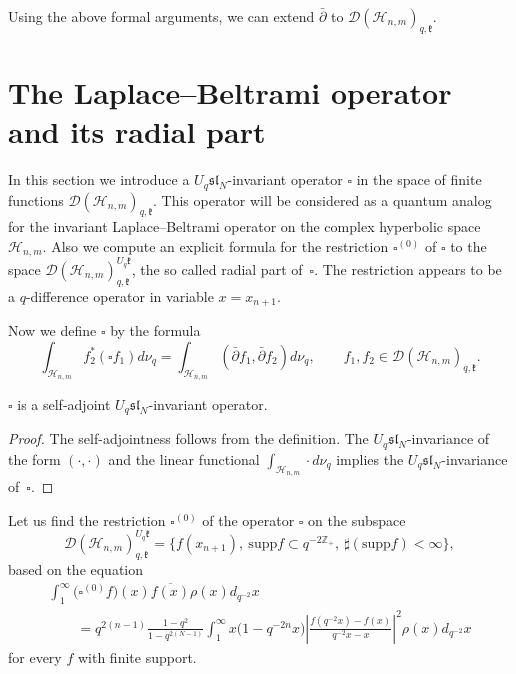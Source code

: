 \documentclass[pdftex]{sigma}
\begin{document}
Using the above formal arguments, we
can extend $\bar \partial$ to
$\mathscr{D}(\mathscr{H}_{n,m})_{q,\mathfrak{k}}$.


\section[The Laplace-Beltrami operator and its radial part]{The Laplace--Beltrami operator and its radial part}\label{sec_6}

In this section we introduce a $U_q \mathfrak{sl}_N$-invariant operator $\square$ in the space of f\/inite
functions $\mathscr{D}(\mathscr{H}_{n,m})_{q, \mathfrak{k}}$. This operator will be considered as a quantum
analog for the invariant Laplace--Beltrami operator on the complex hyperbolic space $\mathscr{H}_{n,m}$. Also
we compute an explicit formula for the restriction $\square^{(0)}$ of $\square$ to the space
$\mathscr{D}(\mathscr{H}_{n,m})_{q,\mathfrak{k}}^{U_q \mathfrak{k}}$, the so called radial part of~$\square$.
The restriction appears to be a $q$-dif\/ference operator in variable $x=x_{n+1}$.

Now we def\/ine $\square$ by the formula
\[
\int_{\mathscr{H}_{n,m}}f_2^* (\square f_1) d\nu_q=\int _{\mathscr{H}_{n,m}} (\bar \partial f_1, \bar
\partial f_2) d\nu_q, \qquad f_1,f_2 \in \mathscr{D}(\mathscr{H}_{n,m})_{q,\mathfrak{k}}.
\]

\begin{proposition}
$\square$ is a self-adjoint $U_q \mathfrak{sl}_N$-invariant operator.
\end{proposition}

\begin{proof} The self-adjointness follows from the def\/inition. The $U_q \mathfrak{sl}_N$-invariance of the
form $(\cdot,\cdot)$ and the linear functional $\int_{\mathscr{H}_{n,m}} \cdot d\nu_q$ implies the $U_q
\mathfrak{sl}_N$-invariance of~$\square$.
\end{proof}



Let us f\/ind the restriction $\square^{(0)}$ of the operator $\square$ on the subspace
\[
\mathscr{D}(\mathscr{H}_{n,m})_{q,\mathfrak{k}}^{U_q \mathfrak{k}}=\big\{ f(x_{n+1}), \ \mathrm{supp} f \subset q^{-2 \mathbb{Z}_+},\
\sharp (\mathrm{supp} f) < \infty \big\},
\]
based on the equation
\begin{gather*}
\int_1^\infty \big(\square^{(0)} f\big) (x) \overline{f(x)} \rho(x) d_{q^{-2}} x \\
\qquad{} = q^{2(n-1)}
\frac{1-q^2}{1-q^{2(N-1)}} \int_1^\infty x \big(1-q^{-2n} x\big) \left| \frac{f(q^{-2}x)-f(x)}{q^{-2}x - x}
\right|^2 \rho(x) d_{q^{-2}} x
\end{gather*}
for every $f$ with f\/inite support.
\end{document}
